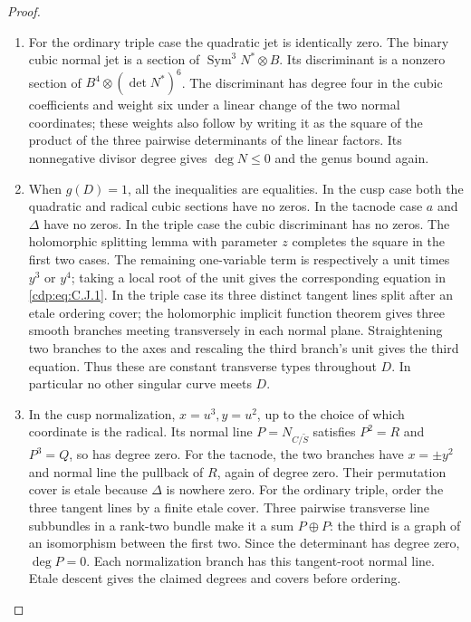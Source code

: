 \begin{proof}
\begin{enumerate}[label={$\langle1\rangle$\arabic*.},leftmargin=*]
\item For the ordinary triple case the quadratic jet is identically zero. The binary cubic normal jet is a section of $\operatorname{Sym}^3N^*\otimes B$. Its discriminant is a nonzero section of
$B^4\otimes(\det N^*)^6$. The discriminant has degree four in the cubic coefficients and weight six under a linear change of the two normal coordinates; these weights also follow by writing it as the square of the product of the three pairwise determinants of the linear factors. Its nonnegative divisor degree gives $\deg N\le0$ and the genus bound again.

\item When $g(D)=1$, all the inequalities are equalities. In the cusp case both the quadratic and radical cubic sections have no zeros. In the tacnode case $a$ and $\Delta$ have no zeros. In the triple case the cubic discriminant has no zeros. The holomorphic splitting lemma with parameter $z$ completes the square in the first two cases. The remaining one-variable term is respectively a unit times $y^3$ or $y^4$; taking a local root of the unit gives the corresponding equation in \eqref{cdp:eq:C.J.1}. In the triple case its three distinct tangent lines split after an etale ordering cover; the holomorphic implicit function theorem gives three smooth branches meeting transversely in each normal plane. Straightening two branches to the axes and rescaling the third branch's unit gives the third equation. Thus these are constant transverse types throughout $D$. In particular no other singular curve meets $D$.

\item In the cusp normalization, $x=u^3,y=u^2$, up to the choice of which coordinate is the radical. Its normal line $P=N_{C/\widetilde S}$ satisfies $P^2=R$ and $P^3=Q$, so has degree zero. For the tacnode, the two branches have $x=\pm y^2$ and normal line the pullback of $R$, again of degree zero. Their permutation cover is etale because $\Delta$ is nowhere zero. For the ordinary triple, order the three tangent lines by a finite etale cover. Three pairwise transverse line subbundles in a rank-two bundle make it a sum $P\oplus P$: the third is a graph of an isomorphism between the first two. Since the determinant has degree zero, $\deg P=0$. Each normalization branch has this tangent-root normal line. Etale descent gives the claimed degrees and covers before ordering.


\end{enumerate}
\end{proof}
